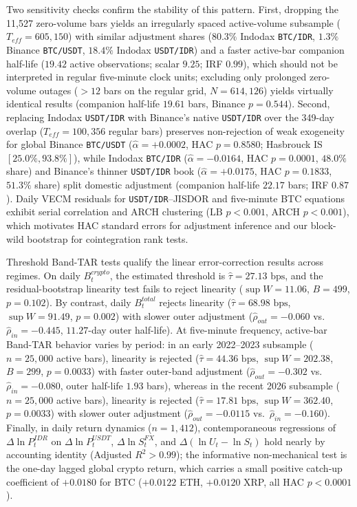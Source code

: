 Two sensitivity checks confirm the stability of this pattern. First, dropping the 11,527 zero-volume bars yields an irregularly spaced active-volume subsample ($T_{eff} = 605,150$) with similar adjustment shares ($80.3\%$ Indodax \texttt{BTC/IDR}, $1.3\%$ Binance \texttt{BTC/USDT}, $18.4\%$ Indodax \texttt{USDT/IDR}) and a faster active-bar companion half-life ($19.42$ active observations; scalar $9.25$; IRF $0.99$), which should not be interpreted in regular five-minute clock units; excluding only prolonged zero-volume outages ($>12$ bars on the regular grid, $N = 614,126$) yields virtually identical results (companion half-life $19.61$ bars, Binance $p = 0.544$). Second, replacing Indodax \texttt{USDT/IDR} with Binance's native \texttt{USDT/IDR} over the 349-day overlap ($T_{eff} = 100,356$ regular bars) preserves non-rejection of weak exogeneity for global Binance \texttt{BTC/USDT} ($\hat{\alpha} = +0.0002$, HAC $p = 0.8580$; Hasbrouck IS $[25.0\%, 93.8\%]$), while Indodax \texttt{BTC/IDR} ($\hat{\alpha} = -0.0164$, HAC $p = 0.0001$, $48.0\%$ share) and Binance's thinner \texttt{USDT/IDR} book ($\hat{\alpha} = +0.0175$, HAC $p = 0.1833$, $51.3\%$ share) split domestic adjustment (companion half-life $22.17$ bars; IRF $0.87$). Daily VECM residuals for \texttt{USDT/IDR}--JISDOR and five-minute BTC equations exhibit serial correlation and ARCH clustering ($\text{LB } p < 0.001$, $\text{ARCH } p < 0.001$), which motivates HAC standard errors for adjustment inference and our block-wild bootstrap for cointegration rank tests.

Threshold Band-TAR tests qualify the linear error-correction results across regimes. On daily $B_t^{crypto}$, the estimated threshold is $\hat{\tau} = 27.13\text{ bps}$, and the residual-bootstrap linearity test fails to reject linearity ($\sup W = 11.06$, $B = 499$, $p = 0.102$). By contrast, daily $B_t^{total}$ rejects linearity ($\hat{\tau} = 68.98\text{ bps}$, $\sup W = 91.49$, $p = 0.002$) with slower outer adjustment ($\hat{\rho}_{out} = -0.060$ vs.\ $\hat{\rho}_{in} = -0.445$, $11.27$-day outer half-life). At five-minute frequency, active-bar Band-TAR behavior varies by period: in an early 2022--2023 subsample ($n = 25,000$ active bars), linearity is rejected ($\hat{\tau} = 44.36\text{ bps}$, $\sup W = 202.38$, $B = 299$, $p = 0.0033$) with faster outer-band adjustment ($\hat{\rho}_{out} = -0.302$ vs.\ $\hat{\rho}_{in} = -0.080$, outer half-life $1.93$ bars), whereas in the recent 2026 subsample ($n = 25,000$ active bars), linearity is rejected ($\hat{\tau} = 17.81\text{ bps}$, $\sup W = 362.40$, $p = 0.0033$) with slower outer adjustment ($\hat{\rho}_{out} = -0.0115$ vs.\ $\hat{\rho}_{in} = -0.160$). Finally, in daily return dynamics ($n = 1,412$), contemporaneous regressions of $\Delta \ln P_t^{IDR}$ on $\Delta \ln P_t^{USDT}$, $\Delta \ln S_t^{FX}$, and $\Delta(\ln U_t - \ln S_t)$ hold nearly by accounting identity (Adjusted $R^2 > 0.99$); the informative non-mechanical test is the one-day lagged global crypto return, which carries a small positive catch-up coefficient of $+0.0180$ for BTC ($+0.0122$ ETH, $+0.0120$ XRP, all HAC $p < 0.0001$).


